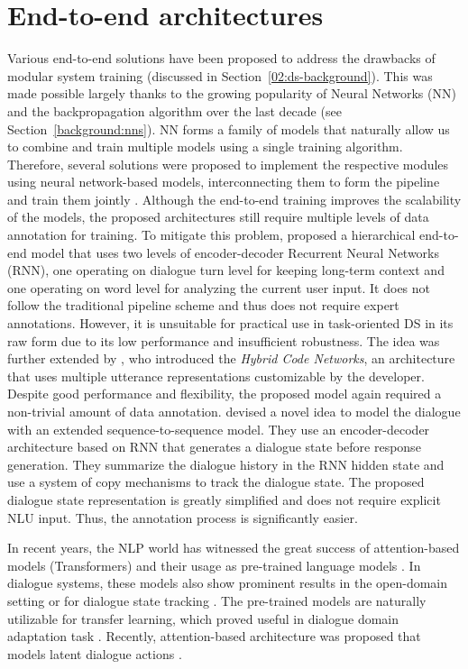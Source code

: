 \section{End-to-end architectures}
\label{relwork:end-to-end}
Various end-to-end solutions have been proposed to address the drawbacks of modular system training (discussed in Section~\ref{02:ds-background}).
This was made possible largely thanks to the growing popularity of Neural Networks (NN) and the backpropagation algorithm over the last decade (see Section~\ref{background:nns}).
NN forms a family of models that naturally allow us to combine and train multiple models using a single training algorithm.
Therefore, several solutions were proposed to implement the respective modules using neural network-based models, interconnecting them to form the pipeline and train them jointly \cite{li-etal-2017-end,wen-etal-2017-network}.
Although the end-to-end training improves the scalability of the models, the proposed architectures still require multiple levels of data annotation for training.
To mitigate this problem, \citet{serban2016building} proposed a hierarchical end-to-end model that uses two levels of encoder-decoder Recurrent Neural Networks (RNN), one operating on dialogue turn level for keeping long-term context and one operating on word level for analyzing the current user input.
It does not follow the traditional pipeline scheme and thus does not require expert annotations.
However, it is unsuitable for practical use in task-oriented DS in its raw form due to its low performance and insufficient robustness.
The idea was further extended by \citet{williams2017hybrid}, who introduced the \textit{Hybrid Code Networks}, an architecture that uses multiple utterance representations customizable by the developer.
Despite good performance and flexibility, the proposed model again required a non-trivial amount of data annotation.
\citet{lei2018sequicity} devised a novel idea to model the dialogue with an extended sequence-to-sequence model.
\label{sec:sequicity}
They use an encoder-decoder architecture based on RNN that generates a dialogue state before response generation.
They summarize the dialogue history in the RNN hidden state and use a system of copy mechanisms to track the dialogue state.
The proposed dialogue state representation is greatly simplified and does not require explicit NLU input.
Thus, the annotation process is significantly easier.

In recent years, the NLP world has witnessed the great success of attention-based models (Transformers) \cite{vaswani2017attention} and their usage as pre-trained language models \cite{devlin-etal-2019-bert}.
In dialogue systems, these models also show prominent results in the open-domain setting \cite{DBLP:journals/corr/abs-1901-08149} or for dialogue state tracking \cite{chao2019bert}.
The pre-trained models are naturally utilizable for transfer learning, which proved useful in dialogue domain adaptation task \citep{shalyminov-etal-2019-shot}.
Recently, attention-based architecture was proposed that models latent dialogue actions \citep{bao2019plato}.

